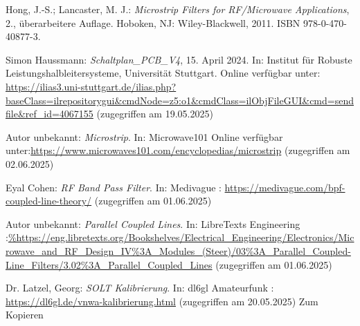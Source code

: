 
\begin{thebibliography}{1}
Hong, J.-S.; Lancaster, M. J.: \emph{Microstrip Filters for RF/Microwave Applications}, 2., überarbeitere Auflage. Hoboken, NJ: Wiley-Blackwell, 2011. ISBN 978-0-470-40877-3.

Simon Haussmann: \emph{Schaltplan\_PCB\_V4}, 15. April 2024. In: Institut für Robuste Leistungshalbleitersysteme, Universität Stuttgart. Online verfügbar unter: \url{https://ilias3.uni-stuttgart.de/ilias.php?baseClass=ilrepositorygui&cmdNode=z5:o1&cmdClass=ilObjFileGUI&cmd=sendfile&ref_id=4067155} (zugegriffen am 19.05.2025)


Autor unbekannt: \emph{Microstrip}. In: Microwave101 Online verfügbar unter:\url{https://www.microwaves101.com/encyclopedias/microstrip} (zugegriffen am 02.06.2025)


Eyal Cohen: \emph{RF Band Pass Filter}. In: Medivague : \url{https://medivague.com/bpf-coupled-line-theory/} (zugegriffen am 01.06.2025)

Autor unbekannt: \emph{Parallel Coupled Lines}. In: LibreTexts Engineering :\url{%https://eng.libretexts.org/Bookshelves/Electrical_Engineering/Electronics/Microwave_and_RF_Design_IV%3A_Modules_(Steer)/03%3A_Parallel_Coupled-Line_Filters/3.02%3A_Parallel_Coupled_Lines} (zugegriffen am 01.06.2025)


Dr.  Latzel, Georg: \emph{SOLT Kalibrierung}. In: dl6gl Amateurfunk : \url{https://dl6gl.de/vnwa-kalibrierung.html} (zugegriffen am 20.05.2025) Zum Kopieren






\end{thebibliography}

\clearpage
